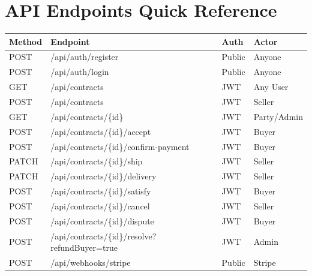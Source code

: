 \documentclass[11pt, a4paper]{article}
\begin{document}
\section{API Endpoints Quick Reference}

\begin{longtable}{@{}llll@{}}
\toprule
\textbf{Method} & \textbf{Endpoint} & \textbf{Auth} & \textbf{Actor} \\
\midrule
POST & /api/auth/register & Public & Anyone \\
POST & /api/auth/login & Public & Anyone \\
GET & /api/contracts & JWT & Any User \\
POST & /api/contracts & JWT & Seller \\
GET & /api/contracts/\{id\} & JWT & Party/Admin \\
POST & /api/contracts/\{id\}/accept & JWT & Buyer \\
POST & /api/contracts/\{id\}/confirm-payment & JWT & Buyer \\
PATCH & /api/contracts/\{id\}/ship & JWT & Seller \\
PATCH & /api/contracts/\{id\}/delivery & JWT & Seller \\
POST & /api/contracts/\{id\}/satisfy & JWT & Buyer \\
POST & /api/contracts/\{id\}/cancel & JWT & Seller \\
POST & /api/contracts/\{id\}/dispute & JWT & Buyer \\
POST & /api/contracts/\{id\}/resolve?refundBuyer=true & JWT & Admin \\
POST & /api/webhooks/stripe & Public & Stripe \\
\bottomrule
\end{longtable}
\end{document}
